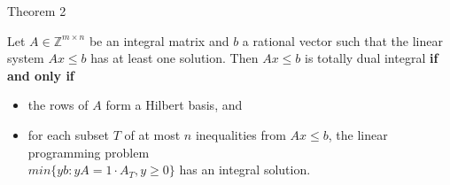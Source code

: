 \documentclass{beamer}
\begin{document}

\begin{frame}

	\begin{block}{Theorem 2}

		Let $A\in \mathbb{Z}^{m \times n}$ be an integral matrix and $b$ a rational vector such that the linear system $Ax \leq b$ has at least one solution. Then $Ax \leq b$ is totally dual integral \textbf{if and only if}\\

		\begin{itemize}

			\item the rows of $A$ form a Hilbert basis, and

			\item for each subset $T$ of at most $n$ inequalities from $Ax\leq b$, the linear programming problem \\
			$min\{yb: yA=1\cdot A_T, y\geq 0 \}$ has an integral solution.

		\end{itemize}

	\end{block}

\end{frame}
\end{document}
